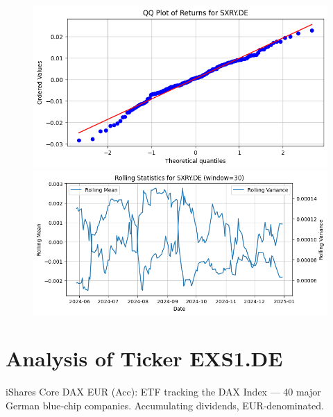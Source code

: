 \documentclass{article}%
\begin{document}
%


\begin{figure}[htbp]%
\begin{minipage}{0.31\textwidth}%
\includegraphics[width=\linewidth]{ticker_images/SXRY.DE_qq_plot.png}%
\end{minipage}%
\begin{minipage}{0.31\textwidth}%
\includegraphics[width=\linewidth]{ticker_images/SXRY.DE_rolling_stats.png}%
\end{minipage}%
\end{figure}

%
\section*{Analysis of Ticker EXS1.DE}%
\label{sec:AnalysisofTickerEXS1.DE}%
iShares Core DAX EUR (Acc): ETF tracking the DAX Index — 40 major German blue‑chip companies. Accumulating dividends, EUR‑denominated.%
\end{document}
